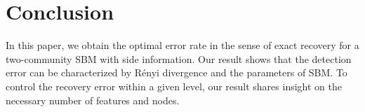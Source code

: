 \documentclass[conference,letterpaper]{IEEEtran}
\begin{document}
\section{Conclusion}\label{s:conclusion}
In this paper, we obtain the optimal error rate in the sense of exact recovery for a two-community SBM with side information. Our result
shows that the detection error can be characterized by Rényi divergence and the parameters of SBM. To control the recovery error within a given level,
our result shares insight on
the necessary number of features and nodes.



\end{document}
